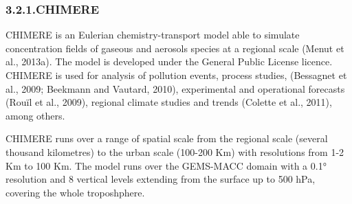 \documentclass[9pt]{report}
\begin{document}
\begin{table}[h!]
\begin{mdbmarginx}{}{}{}{}
\begin{mdcenter}
{{%
\mdhr{}%

\noindent{}%
}}%
\end{mdcenter}\label{models-2}%
\end{mdbmarginx}%
\end{table}%

\subsubsection{3.2.1.\hspace*{0.5em}CHIMERE}\label{sec-chimere}%

\noindent{}CHIMERE is an Eulerian chemistry-transport model able to simulate concentration ﬁelds of gaseous and aerosols species at a regional scale (Menut et al., 2013a). 
The model is developed under the General Public License licence. CHIMERE is used for analysis of pollution events, process studies, (Bessagnet et al., 2009; Beekmann and Vautard, 2010), experimental and operational forecasts (Rouïl et al., 2009), regional climate studies and trends (Colette et al., 2011), among others.%

CHIMERE runs over a range of spatial scale from the regional scale (several thousand kilometres) to the urban scale (100-200 Km) with resolutions from 1-2 Km to 100 Km. 
The model runs over the GEMS-MACC domain with a 0.1° resolution and 8 vertical levels extending from the surface up to 500 hPa, covering the whole troposhphere.%
\end{document}
